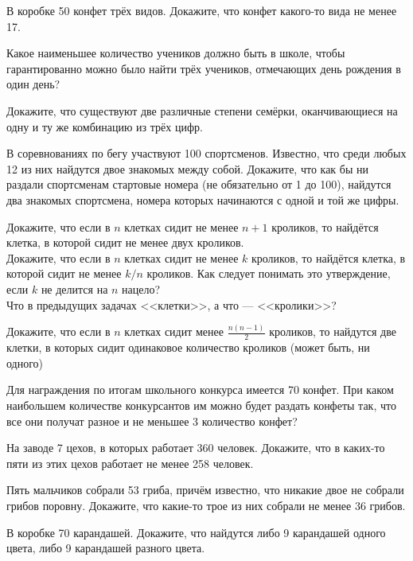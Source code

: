 \documentclass[12pt,a4paper]{article}
\begin{document}

  В коробке 50 конфет трёх видов. Докажите, что конфет какого-то вида не менее 17.


 Какое наименьшее количество учеников должно быть в школе, чтобы гарантированно можно было найти трёх учеников, отмечающих день рождения в один день?

 Докажите, что существуют две различные степени семёрки, оканчивающиеся на одну и ту же комбинацию из трёх цифр. %

 В соревнованиях по бегу участвуют 100 спортсменов. Известно, что среди любых 12 из них найдутся двое знакомых между собой. Докажите, что как бы ни раздали спортсменам стартовые номера (не обязательно от 1 до 100), найдутся два знакомых спортсмена, номера которых начинаются с одной и той же цифры.

 Докажите, что если в $n$ клетках сидит не менее
$n+1$ кроликов, то найдётся клетка, в которой сидит не менее двух кроликов.\\
 Докажите, что если в $n$ клетках сидит не менее
$k$ кроликов, то найдётся клетка, в которой сидит не менее $k/n$ кроликов. Как следует
понимать это утверждение, если $k$ не делится на $n$ нацело?\\
 Что в предыдущих задачах <<клетки>>, а что --- <<кролики>>?

 Докажите, что если в $n$ клетках сидит менее
$\frac{n(n-1)}{2}$ кроликов, то найдутся две клетки, в которых сидит одинаковое количество кроликов (может быть, ни одного)

 Для награждения по итогам школьного конкурса имеется 70 конфет. При каком наибольшем количестве конкурсантов им можно будет раздать конфеты так, что все они получат разное и не меньшее 3 количество конфет?

 На заводе 7 цехов, в которых работает 360 человек. Докажите, что в каких-то пяти из этих цехов работает не менее 258 человек.

 Пять мальчиков собрали 53 гриба, причём известно, что никакие двое не собрали грибов поровну. Докажите, что какие-то трое из них собрали не менее 36 грибов.

 В коробке 70 карандашей. Докажите, что найдутся либо 9 карандашей одного цвета, либо 9 карандашей разного цвета.
\end{document}
